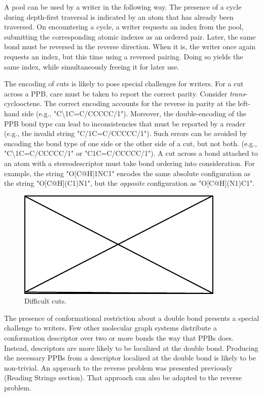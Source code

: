\documentclass{article}
\begin{document}
A pool can be used by a writer in the following way. The presence of a cycle during depth-first traversal is indicated by an atom that has already been traversed. On encountering a cycle, a writer requests an index from the pool, submitting the corresponding atomic indexes as an ordered pair. Later, the same bond must be reversed in the reverse direction. When it is, the writer once again requests an index, but this time using a reversed pairing. Doing so yields the same index, while simultaneously freeing it for later use.

The encoding of cuts is likely to pose special challenges for writers. For a cut across a PPB, care must be taken to report the correct parity. Consider \textit{trans}-cyclooctene. The correct encoding accounts for the reverse in parity at the left-hand side (e.g., "C{\textbackslash}1C=C/CCCCC/1"). Moreover, the double-encoding of the PPB bond type can lead to inconsistencies that must be reported by a reader (e.g., the invalid string "C/1C=C/CCCCC/1"). Such errors can be avoided by encoding the bond type of one side or the other side of a cut, but not both. (e.g., "C{\textbackslash}1C=C/CCCCC/1" or "C1C=C/CCCCC/1"). A cut across a bond attached to an atom with a stereodescriptor must take bond ordering into consideration. For example, the string "O[C@H]1NC1" encodes the same absolute configuration as the string "O[C@H](C1)N1", but the \textit{opposite} configuration as "O[C@H](N1)C1". 

\begin{figure}
    \centering
    \includegraphics{filler}
    \caption{Difficult cuts.}
    \label{fig:difficult-cuts}
\end{figure}

The presence of conformational restriction about a double bond presents a special challenge to writers. Few other molecular graph systems distribute a conformation descriptor over two or more bonds the way that PPBs does. Instead, descriptors are more likely to be localized at the double bond. Producing the necessary PPBs from a descriptor localized at the double bond is likely to be non-trivial. An approach to the reverse problem was presented previously (Reading Strings section). That approach can also be adapted to the reverse problem.
\end{document}

